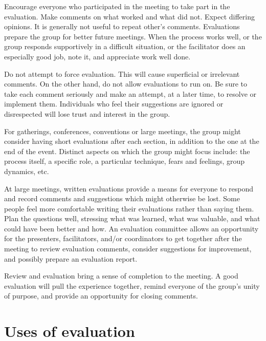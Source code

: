 Encourage everyone who participated in the meeting to take part in
the evaluation. Make comments on what worked and what did
not. Expect differing opinions. It is generally not useful to
repeat other's comments. Evaluations prepare the group for better
future meetings. When the process works well, or the group responds
supportively in a difficult situation, or the facilitator does an
especially good job, note it, and appreciate work well done.

Do not attempt to force evaluation. This will cause superficial or
irrelevant comments. On the other hand, do not allow evaluations to
run on. Be sure to take each comment seriously and make an attempt,
at a later time, to resolve or implement them. Individuals who feel
their suggestions are ignored or disrespected will lose trust and
interest in the group.

For gatherings, conferences, conventions or large meetings, the
group might consider having short evaluations after each section,
in addition to the one at the end of the event. Distinct aspects on
which the group might focus include: the process itself, a specific
role, a particular technique, fears and feelings, group dynamics,
etc.

At large meetings, written evaluations provide a means for
everyone to respond and record comments and suggestions which might
otherwise be lost. Some people feel more comfortable writing their
evaluations rather than saying them. Plan the questions well,
stressing what was learned, what was valuable, and what could have
been better and how. An evaluation committee allows an opportunity
for the presenters, facilitators, and/or coordinators to get
together after the meeting to review evaluation comments, consider
suggestions for improvement, and possibly prepare an evaluation
report.

Review and evaluation bring a sense of completion to the meeting. A good evaluation will pull the experience together, remind everyone of the group's unity of purpose, and provide an opportunity for closing comments.

\section{Uses of evaluation}

